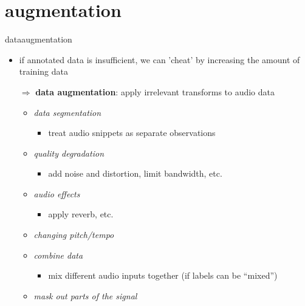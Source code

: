     \section{augmentation}
        \begin{frame}{data}{augmentation}
            \begin{itemize}
                \item   if annotated data is insufficient, we can 'cheat' by increasing the amount of training data
                \item[$\Rightarrow$] \textbf{data augmentation}: apply irrelevant transforms to audio data
                    \begin{itemize}
                        \item<2->   \textit{data segmentation}
                            \begin{itemize}
                                \item   treat audio snippets as separate observations
                            \end{itemize}
                        \item<3->   \textit{quality degradation}
                            \begin{itemize}
                                \item   add noise and distortion, limit bandwidth, etc.
                            \end{itemize}
                        \item<4->   \textit{audio effects}
                            \begin{itemize}
                                \item   apply reverb, etc.
                            \end{itemize}
                        \item<5->   \textit{changing pitch/tempo}
                        \item<6->   \textit{combine data}
                            \begin{itemize}
                                \item   mix different audio inputs together (if labels can be ``mixed'')
                            \end{itemize}
                        \item<7->   \textit{mask out parts of the signal}
                    \end{itemize}
            \end{itemize}
        \end{frame}


